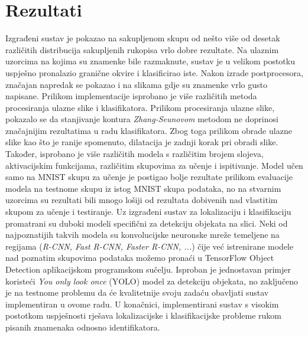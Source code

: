 \documentclass[times, utf8, diplomski]{fer}
\theoremstyle{definition}
\begin{document}
\chapter{Rezultati}
Izgrađeni sustav je pokazao na sakupljenom skupu od nešto više od desetak različitih distribucija sakupljenih rukopisa vrlo dobre rezultate. Na ulaznim uzorcima na kojima su znamenke bile razmaknute, sustav je u velikom postotku uspješno pronalazio granične okvire i klasificirao iste. Nakon izrade postprocesora, značajan napredak se pokazao i na slikama gdje su znamenke vrlo gusto napisane.
Prilikom implementacije isprobano je više različitih metoda procesiranja ulazne slike i klasifikatora. Prilikom procesiranja ulazne slike, pokazalo se da stanjivanje kontura \textit{Zhang-Seunovom} metodom ne doprinosi značajnijim rezultatima u radu klasifikatora. Zbog toga prilikom obrade ulazne slike kao što je ranije spomenuto, dilatacija je zadnji korak pri obradi slike. Također, isprobano je više različitih modela s različitim brojem slojeva, aktivacijskim funkcijama, različitim skupovima za učenje i ispitivanje. Model učen samo na MNIST skupu za učenje je postigao bolje rezultate prilikom evaluacije modela na testnome skupu iz istog MNIST skupa podataka, no na stvarnim uzorcima su rezultati bili mnogo lošiji od rezultata dobivenih nad vlastitim skupom za učenje i testiranje. Uz izgrađeni sustav za lokalizaciju i klasifikaciju promatrani su duboki modeli specifični za detekciju objekata na slici. Neki od najpoznatijih takvih modela su konvolucijske neuronske mreže temeljene na regijama (\textit{R-CNN, Fast R-CNN, Faster R-CNN,  ...}) čije već istrenirane modele nad poznatim skupovima podataka možemo pronaći u TensorFlow Object Detection aplikacijskom programskom sučelju. Isproban je jednostavan primjer koristeći \textit{You only look once} (YOLO) model za detekciju objekata, no zaključeno je na testnome problemu da će kvalitetnije svoju zadaću obavljati sustav implementiran u ovome radu. U konačnici, implementirani sustav s visokim postotkom uspješnosti rješava lokalizacijske i klasifikacijske probleme rukom pisanih znamenaka odnosno identifikatora.
\end{document}
